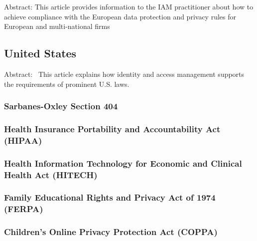 Abstract: This article provides information to the IAM practitioner
about how to achieve compliance with the European data protection and
privacy rules for European and multi-national firms

\hypertarget{united-states}{%
\subsection{United States}\label{united-states}}

Abstract:~ This article explains how identity and access management
supports the requirements of prominent U.S. laws.

\hypertarget{sarbanes-oxley-section-404}{%
\subsubsection{Sarbanes-Oxley Section
404}\label{sarbanes-oxley-section-404}}

\hypertarget{health-insurance-portability-and-accountability-act-hipaa}{%
\subsubsection{Health Insurance Portability and Accountability Act
(HIPAA)}\label{health-insurance-portability-and-accountability-act-hipaa}}

\hypertarget{health-information-technology-for-economic-and-clinical-health-act-hitech}{%
\subsubsection{Health Information Technology for Economic and Clinical
Health Act
(HITECH)}\label{health-information-technology-for-economic-and-clinical-health-act-hitech}}

\hypertarget{family-educational-rights-and-privacy-act-of-1974-ferpa}{%
\subsubsection{Family Educational Rights and Privacy Act of 1974
(FERPA)}\label{family-educational-rights-and-privacy-act-of-1974-ferpa}}

\hypertarget{childrens-online-privacy-protection-act-coppa}{%
\subsubsection{Children's Online Privacy Protection Act
(COPPA)}\label{childrens-online-privacy-protection-act-coppa}}

